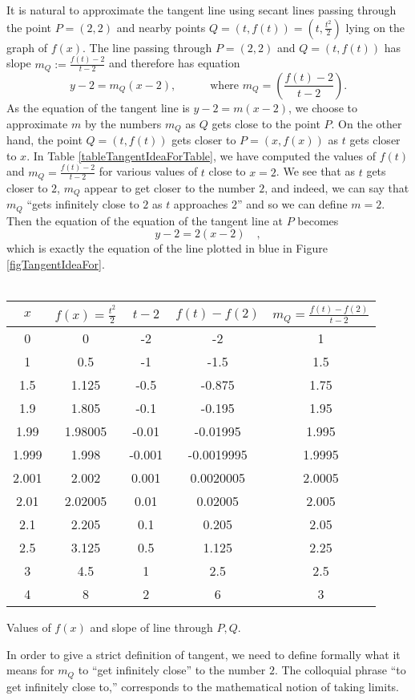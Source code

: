 \documentclass[12pt]{book}
\newenvironment{tableFixed}{~\\~\medskip\begin{minipage}{\textwidth}\captionsetup{type=table} }{ \medskip \end{minipage} \medskip }
\begin{document}
It is natural to approximate the tangent line using secant lines passing through the point $ P=(2, 2)$ and nearby points $Q=(t,f(t))=(t, \frac{t^2}{2})$ lying on the graph of $f(x)$. The line passing through $P=(2,2) $ and $Q=(t,f(t))$ has slope $m_Q:=\frac{f(t)-2}{t-2}$ and therefore has equation
\[
y-2=m_Q(x-2), \quad\quad \quad\text{where~} m_Q= \left(\frac{f(t)-2}{t-2}\right).
\]
As the equation of the tangent line is $y-2=m(x-2)$, we choose to approximate $m$ by the numbers $m_Q$ as $Q$ gets close to the point $P$. On the other hand, the point $Q=(t,f(t))$ gets closer to $P= (x, f(x))$ as $t$ gets closer to $x$.
In Table \ref{tableTangentIdeaForTable}, we have computed the values of $f(t)$ and $m_Q=\frac{f(t)-2}{t-2}$ for various values of $t$ close to $x=2$. We see that as $t$ gets closer to $2$, $m_Q$ appear to get closer to the number $2$, and indeed, we can say that $m_Q$ ``gets infinitely close to $2$ as $t$ approaches $2$'' and so we can define $m=2$. Then the equation of the equation of the tangent line at $P$ becomes 
\[
y-2=2(x-2)\quad ,
\]
which is exactly the equation of the line plotted in blue in Figure \ref{figTangentIdeaFor}.
\begin{tableFixed}
\begin{center}
\begin{tabular}{c|c|c|c|c}
$x$& $f(x)=\frac{t^2}2$& $t-2$ & $f(t)-f(2)$ & $m_Q=\frac{f(t)-f(2)}{t-2}$ \\\hline
0& 0& -2& -2& 1 \\
1& 0.5& -1& -1.5& 1.5 \\
1.5& 1.125& -0.5& -0.875& 1.75\\
1.9& 1.805& -0.1& -0.195& 1.95\\
1.99& 1.98005& -0.01& -0.01995& 1.995\\
1.999& 1.998& -0.001& -0.0019995& 1.9995\\\hline
2.001& 2.002& 0.001& 0.0020005& 2.0005\\
2.01& 2.02005& 0.01& 0.02005& 2.005\\
2.1& 2.205& 0.1& 0.205& 2.05\\
2.5& 3.125& 0.5& 1.125& 2.25\\
3& 4.5& 1& 2.5& 2.5\\
4& 8& 2& 6& 3 \\
\end{tabular}
\end{center}
\caption{ Values of $f(x)$ and slope of line through $P,Q$. \label{tableTangentIdeaForTable}}
\end{tableFixed}
In order to give a strict definition of tangent, we need to define formally what it means for $m_Q$ to ``get infinitely close'' to the number $2$. The colloquial phrase ``to get infinitely close to,'' corresponds to the mathematical notion of taking limits.
\end{document}
